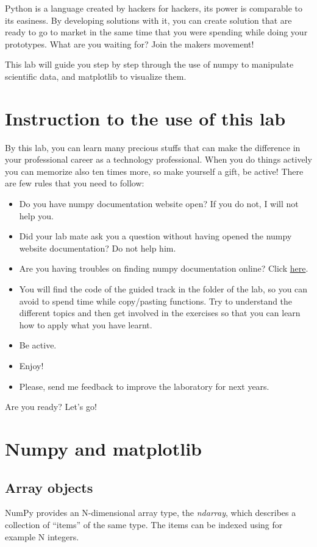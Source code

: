 \documentclass[aps,letterpaper,10pt]{revtex4}
\begin{document}
Python is a language created by hackers for hackers, its power is comparable to its easiness. By developing solutions with it, you can create solution that are ready to go to market in the same time that you were spending while doing your prototypes. What are you waiting for? Join the makers movement! \vspace{3mm}  
 
This lab will guide you step by step through the use of numpy to manipulate scientific data, and matplotlib to visualize them. \vspace{3mm}

\section{Instruction to the use of this lab}
By this lab, you can learn many precious stuffs that can make the difference in your professional career as a technology professional. When you do things actively you can memorize also ten times more, so make yourself a gift, be active! There are few rules that you need to follow:
\begin{itemize}
\item Do you have numpy documentation website open? If you do not, I will not help you.
\item Did your lab mate ask you a question without having opened the numpy website documentation? Do not help him.
\item Are you having troubles on finding numpy documentation online? Click  \href{http://lmgtfy.com/?q=numpy+doc}{here}.
\item{You will find the code of the guided track in the folder of the lab, so you can avoid to spend time while copy/pasting functions. Try to understand the different topics and then get involved in the exercises so that you can learn how to apply what you have learnt.}
\item{Be active.}
\item{Enjoy!}
\item{Please, send me feedback to improve the laboratory for next years.}
\end{itemize}
Are you ready? Let's go!

\section{Numpy and matplotlib}
\subsection{Array objects}
NumPy provides an N-dimensional array type, the \textit{ndarray}, which describes a collection of “items” of the same type. The items can be indexed using for example N integers.
\end{document}

